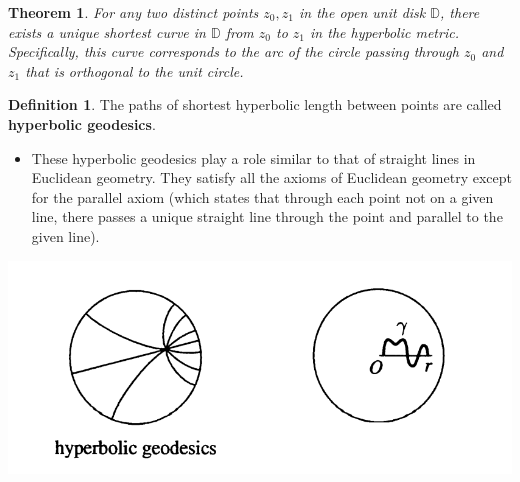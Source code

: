 \documentclass[
]{book}
\providecommand{\tightlist}{%
  \setlength{\itemsep}{0pt}\setlength{\parskip}{0pt}}
\newtheorem{theorem}{Theorem}[chapter]
\theoremstyle{definition}
\newtheorem{definition}{Definition}[chapter]
\theoremstyle{definition}
\theoremstyle{definition}
\theoremstyle{definition}
\theoremstyle{remark}
\begin{document}
\begin{theorem}
\protect\hypertarget{thm:unnamed-chunk-39}{}\label{thm:unnamed-chunk-39}For any two distinct points \(z_0, z_1\) in the open unit disk \(\mathbb{D}\), there exists a unique shortest curve in \(\mathbb{D}\) from \(z_0\) to \(z_1\) in the hyperbolic metric. Specifically, this curve corresponds to the arc of the circle passing through \(z_0\) and \(z_1\) that is orthogonal to the unit circle.
\end{theorem}

\begin{definition}
\protect\hypertarget{def:unnamed-chunk-40}{}\label{def:unnamed-chunk-40}The paths of shortest hyperbolic length between points are called \textbf{hyperbolic geodesics}.
\end{definition}

\begin{itemize}
\tightlist
\item
  These hyperbolic geodesics play a role similar to that of straight lines in Euclidean geometry. They satisfy all the axioms of Euclidean geometry except for the parallel axiom (which states that through each point not on a given line, there passes a unique straight line through the point and parallel to the given line).
\end{itemize}

\includegraphics[width=11.5in]{figures/Riemann_Mapping_Therom/fig3}
\end{document}
